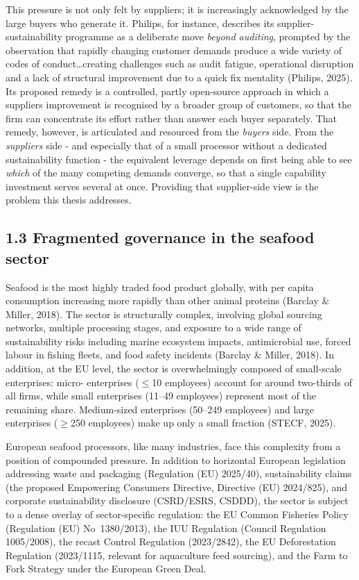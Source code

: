 \documentclass[
]{article}
\begin{document}
This pressure is not only felt by suppliers; it is increasingly
acknowledged by the large buyers who generate it. Philips, for instance,
describes its supplier-sustainability programme as a deliberate move
\emph{beyond auditing}, prompted by the observation that
\textquotesingle rapidly changing customer demands\textquotesingle{}
produce \textquotesingle a wide variety of codes of conduct\ldots creating
challenges such as audit fatigue, operational disruption and a lack of
structural improvement due to a \textquotesingle quick
fix\textquotesingle{} mentality\textquotesingle{} (Philips, 2025). Its
proposed remedy is a controlled, partly open-source approach in which a
supplier\textquotesingle s improvement is recognised by a broader group of
customers, so that the firm can concentrate its effort rather than answer
each buyer separately. That remedy, however, is articulated and resourced
from the \emph{buyer\textquotesingle s} side. From the
\emph{supplier\textquotesingle s} side - and especially that of a small
processor without a dedicated sustainability function - the equivalent
leverage depends on first being able to see \emph{which} of the many
competing demands converge, so that a single capability investment serves
several at once. Providing that supplier-side view is the problem this
thesis addresses.

\subsection{1.3 Fragmented governance in the seafood
sector}\label{fragmented-governance-in-the-seafood-sector}

Seafood is the most highly traded food product globally, with per capita
consumption increasing more rapidly than other animal proteins (Barclay
\& Miller, 2018). The sector is structurally complex, involving global
sourcing networks, multiple processing stages, and exposure to a wide
range of sustainability risks including marine
ecosystem impacts, antimicrobial use, forced labour in fishing fleets,
and food safety incidents (Barclay \& Miller, 2018). In addition, at the EU level, the sector is overwhelmingly composed of small-scale enterprises: micro-
enterprises ($\leq$10 employees) account for around two-thirds of all firms, while small
enterprises (11--49 employees) represent most of the remaining share. Medium-sized
enterprises (50--249 employees) and large enterprises ($\geq$250 employees) make
up only a small fraction (STECF, 2025).

European seafood processors, like many industries, face this complexity from a position of
compounded pressure. In addition to horizontal European legislation
addressing waste and packaging (Regulation (EU) 2025/40), sustainability
claims (the proposed Empowering Consumers Directive, Directive (EU)
2024/825), and corporate sustainability disclosure (CSRD/ESRS, CSDDD),
the sector is subject to a dense overlay of sector-specific regulation:
the EU Common Fisheries Policy (Regulation (EU) No~1380/2013), the IUU
Regulation (Council Regulation 1005/2008), the recast Control Regulation
(2023/2842), the EU Deforestation Regulation (2023/1115, relevant for
aquaculture feed sourcing), and the Farm to Fork Strategy under the
European Green Deal.
\end{document}
